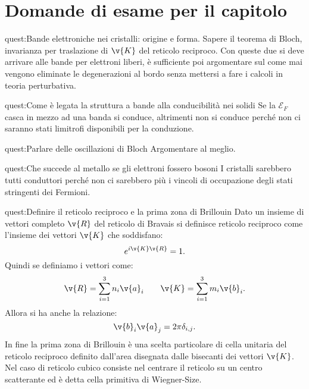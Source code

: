 \clearpage 
\section*{Domande di esame per il capitolo}%
\begin{quest}{quest:Bande elettroniche nei cristalli: origine e forma.}
Sapere il teorema di Bloch, invarianza per traslazione di $\v{K}$ del reticolo reciproco. Con queste due si deve arrivare alle bande per elettroni liberi, è sufficiente poi argomentare sul come mai vengono eliminate le degenerazioni al bordo senza mettersi a fare i calcoli in teoria perturbativa.
\end{quest}
\begin{quest}{quest:Come è legata la struttura a bande alla conducibilità nei solidi}
Se la $\mathcal{E}_F$ casca in mezzo ad una banda si conduce, altrimenti non si conduce perché non ci saranno stati limitrofi disponibili per la conduzione.
\end{quest}
\begin{quest}{quest:Parlare delle oscillazioni di Bloch}
Argomentare al meglio.
\end{quest}
\begin{quest}{quest:Che succede al metallo se gli elettroni fossero bosoni}
I cristalli sarebbero tutti conduttori perché non ci sarebbero più i vincoli di occupazione degli stati stringenti dei Fermioni.
\end{quest}
\begin{quest}{quest:Definire il reticolo reciproco e la prima zona di Brillouin}
Dato un insieme di vettori completo $\v{R}$ del reticolo di Bravais si definisce reticolo reciproco come l'insieme dei vettori $\v{K}$ che soddisfano:
\[
    e^{i\v{K}\v{R}}=1 
.\]
Quindi se definiamo i vettori come:
\[
    \v{R}=\sum_{i=1}^{3} n_i\v{a}_i 
    \qquad
    \v{K}= \sum_{i=1}^{3} m_i\v{b}_i
.\] 
Allora si ha anche la relazione:
\[
    \v{b}_i\v{a}_j = 2\pi\delta_{i,j}
.\] 
In fine la prima zona di Brillouin è una scelta particolare di cella unitaria del reticolo reciproco definito dall'area disegnata dalle bisecanti dei vettori $\v{K}$. Nel caso di reticolo cubico consiste nel centrare il reticolo su un centro scatterante ed è detta cella primitiva di Wiegner-Size.
\end{quest}
